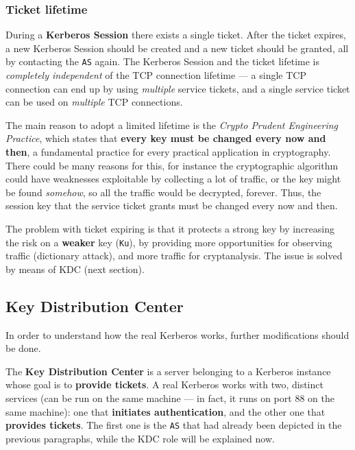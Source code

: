 \documentclass[10pt]{extreport}
\begin{document}
\subsubsection{Ticket lifetime}

During a \textbf{Kerberos Session} there exists a single ticket. After the
ticket expires, a new Kerberos Session should be created and a new ticket
should be granted, all by contacting the \texttt{AS} again. The Kerberos
Session and the ticket lifetime is \emph{completely independent} of the TCP
connection lifetime --- a single TCP connection can end up by using
\emph{multiple} service tickets, and a single service ticket can be used on
\emph{multiple} TCP connections.

The main reason to adopt a limited lifetime is the \emph{Crypto Prudent
Engineering Practice}, which states that \textbf{every key must be changed
every now and then}, a fundamental practice for every practical application in
cryptography. There could be many reasons for this, for instance the
cryptographic algorithm could have weaknesses exploitable by collecting a lot
of traffic, or the key might be found \emph{somehow}, so all the traffic would
be decrypted, forever. Thus, the session key that the service ticket grants
must be changed every now and then.

The problem with ticket expiring is that it protects a strong key by increasing
the risk on a \textbf{weaker} key (\texttt{Ku}), by providing more
opportunities for observing traffic (dictionary attack), and more traffic for
cryptanalysis. The issue is solved by means of KDC (next section).

\subsection{Key Distribution Center}

In order to understand how the real Kerberos works, further modifications
should be done.

The \textbf{Key Distribution Center} is a server belonging to a Kerberos instance
whose goal is to \textbf{provide tickets}. A real Kerberos works with two,
distinct services (can be run on the same machine --- in fact, it runs on port
88 on the same machine): one that \textbf{initiates authentication}, and the
other one that \textbf{provides tickets}. The first one is the \texttt{AS} that
had already been depicted in the previous paragraphs, while the KDC role will
be explained now.
\end{document}
